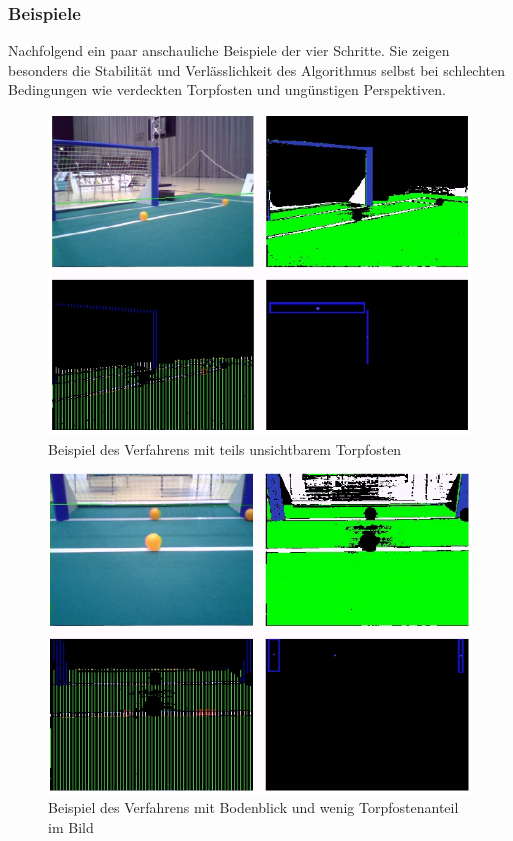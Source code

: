 \documentclass[a4paper,12pt]{article}
\begin{document}
\subsubsection{Beispiele}
Nachfolgend ein paar anschauliche Beispiele der vier Schritte. Sie zeigen
besonders die Stabilität und Verlässlichkeit des Algorithmus selbst bei 
schlechten Bedingungen wie verdeckten Torpfosten und ungünstigen Perspektiven.
\begin{figure}[H]
\includegraphics[scale=0.8]{example-detection1.png}
\caption{Beispiel des Verfahrens mit teils unsichtbarem Torpfosten}
\label{fig:example1}
\end{figure}

\begin{figure}[H]
\includegraphics[scale=0.8]{example-detection2.png}
\caption{Beispiel des Verfahrens mit Bodenblick und wenig Torpfostenanteil im Bild}
\label{fig:example2}
\end{figure}
\end{document}
